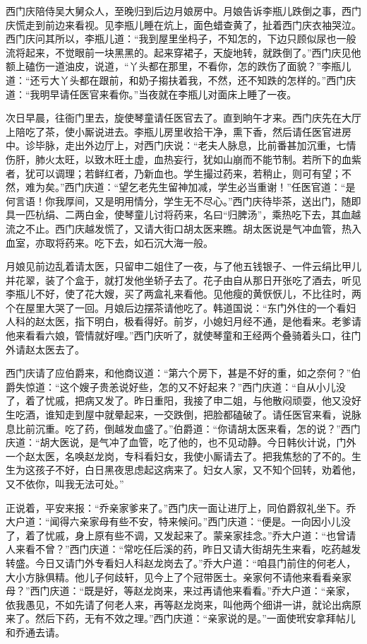 西门庆陪侍吴大舅众人，至晚归到后边月娘房中。月娘告诉李瓶儿跌倒之事，西门庆慌走到前边来看视。见李瓶儿睡在炕上，面色蜡查黄了，扯着西门庆衣袖哭泣。西门庆问其所以，李瓶儿道：“我到屋里坐杩子，不知怎的，下边只顾似尿也一般流将起来，不觉眼前一块黑黑的。起来穿裙子，天旋地转，就跌倒了。”西门庆见他额上磕伤一道油皮，说道，“丫头都在那里，不看你，怎的跌伤了面貌？”李瓶儿道：“还亏大丫头都在跟前，和奶子搊扶着我，不然，还不知跌的怎样的。”西门庆道：“我明早请任医官来看你。”当夜就在李瓶儿对面床上睡了一夜。

次日早晨，往衙门里去，旋使琴童请任医官去了。直到晌午才来。西门庆先在大厅上陪吃了茶，使小厮说进去。李瓶儿房里收拾干净，熏下香，然后请任医官进房中。诊毕脉，走出外边厅上，对西门庆说：“老夫人脉息，比前番甚加沉重，七情伤肝，肺火太旺，以致木旺土虚，血热妄行，犹如山崩而不能节制。若所下的血紫者，犹可以调理；若鲜红者，乃新血也。学生撮过药来，若稍止，则可有望；不然，难为矣。”西门庆道：“望乞老先生留神加减，学生必当重谢！”任医官道：“是何言语！你我厚间，又是明用情分，学生无不尽心。”西门庆待毕茶，送出门，随即具一匹杭绢、二两白金，使琴童儿讨将药来，名曰“归脾汤”，乘热吃下去，其血越流之不止。西门庆越发慌了，又请大街口胡太医来瞧。胡太医说是气冲血管，热入血室，亦取将药来。吃下去，如石沉大海一般。

月娘见前边乱着请太医，只留申二姐住了一夜，与了他五钱银子、一件云绢比甲儿并花翠，装了个盒于，就打发他坐轿子去了。花子由自从那日开张吃了酒去，听见李瓶儿不好，使了花大嫂，买了两盒礼来看他。见他瘦的黄恹恹儿，不比往时，两个在屋里大哭了一回。月娘后边摆茶请他吃了。韩道国说：“东门外住的一个看妇人科的赵太医，指下明白，极看得好。前岁，小媳妇月经不通，是他看来。老爹请他来看看六娘，管情就好哩。”西门庆听了，就使琴童和王经两个叠骑着头口，往门外请赵太医去了。

西门庆请了应伯爵来，和他商议道：“第六个房下，甚是不好的重，如之奈何？”伯爵失惊道：“这个嫂子贵恙说好些，怎的又不好起来？”西门庆道：“自从小儿没了，着了忧戚，把病又发了。昨日重阳，我接了申二姐，与他散闷顽耍，他又没好生吃酒，谁知走到屋中就晕起来，一交跌倒，把脸都磕破了。请任医官来看，说脉息比前沉重。吃了药，倒越发血盛了。”伯爵道：“你请胡太医来看，怎的说？”西门庆道：“胡大医说，是气冲了血管，吃了他的，也不见动静。今日韩伙计说，门外一个赵太医，名唤赵龙岗，专科看妇女，我使小厮请去了。把我焦愁的了不的。生生为这孩子不好，白日黑夜思虑起这病来了。妇女人家，又不知个回转，劝着他，又不依你，叫我无法可处。”

正说着，平安来报：“乔亲家爹来了。”西门庆一面让进厅上，同伯爵叙礼坐下。乔大户道：“闻得六亲家母有些不安，特来候问。”西门庆道：“便是。一向因小儿没了，着了忧戚，身上原有些不调，又发起来了。蒙亲家挂念。”乔大户道：“也曾请人来看不曾？”西门庆道：“常吃任后溪的药，昨日又请大街胡先生来看，吃药越发转盛。今日又请门外专看妇人科赵龙岗去了。”乔大户道：“咱县门前住的何老人，大小方脉俱精。他儿子何歧轩，见今上了个冠带医士。亲家何不请他来看看亲家母？”西门庆道：“既是好，等赵龙岗来，来过再请他来看看。”乔大户道：“亲家，依我愚见，不如先请了何老人来，再等赵龙岗来，叫他两个细讲一讲，就论出病原来了。然后下药，无有不效之理。”西门庆道：“亲家说的是。”一面使玳安拿拜帖儿和乔通去请。


